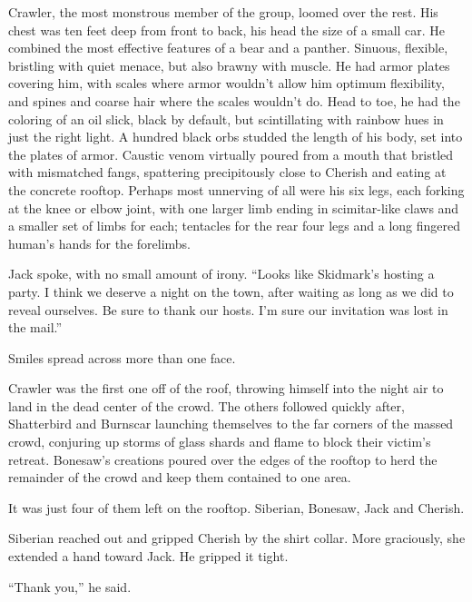 Crawler, the most monstrous member of the group, loomed over the rest.  His chest was ten feet deep from front to back, his head the size of a small car.  He combined the most effective features of a bear and a panther.  Sinuous, flexible, bristling with quiet menace, but also brawny with muscle.  He had armor plates covering him, with scales where armor wouldn't allow him optimum flexibility, and spines and coarse hair where the scales wouldn't do.  Head to toe, he had the coloring of an oil slick, black by default, but scintillating with rainbow hues in just the right light.  A hundred black orbs studded the length of his body, set into the plates of armor.  Caustic venom virtually poured from a mouth that bristled with mismatched fangs, spattering precipitously close to Cherish and eating at the concrete rooftop.  Perhaps most unnerving of all were his six legs, each forking at the knee or elbow joint, with one larger limb ending in scimitar-like claws and a smaller set of limbs for each; tentacles for the rear four legs and a long fingered human's hands for the forelimbs.



Jack spoke, with no small amount of irony.  ``Looks like Skidmark's hosting a party.  I think we deserve a night on the town, after waiting as long as we did to reveal ourselves.  Be sure to thank our hosts.  I'm sure our invitation was lost in the mail.''



Smiles spread across more than one face.



Crawler was the first one off of the roof, throwing himself into the night air to land in the dead center of the crowd.  The others followed quickly after, Shatterbird and Burnscar launching themselves to the far corners of the massed crowd, conjuring up storms of glass shards and flame to block their victim's retreat.  Bonesaw's creations poured over the edges of the rooftop to herd the remainder of the crowd and keep them contained to one area.



It was just four of them left on the rooftop.  Siberian, Bonesaw, Jack and Cherish.



Siberian reached out and gripped Cherish by the shirt collar.  More graciously, she extended a hand toward Jack.  He gripped it tight.



``Thank you,'' he said.



